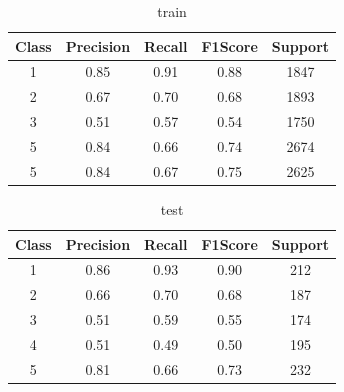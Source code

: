 \begin{enumerate}[label=(\alph*)]
\begin{enumerate}[label=\roman*.]
                    \begin{table}[!htb]
                        \centering
                        \begin{tabular}{ccccc}
                            \hline
                            Class & Precision & Recall & F1Score & Support \\ \hline
                            1     & 0.85      & 0.91   & 0.88    & 1847    \\
                            2     & 0.67      & 0.70   & 0.68    & 1893    \\
                            3     & 0.51      & 0.57   & 0.54    & 1750    \\
                            5     & 0.84      & 0.66   & 0.74    & 2674    \\
                            5     & 0.84      & 0.67   & 0.75    & 2625    \\ \hline
                        \end{tabular}
                        \caption{train}
                        \label{part d train depth 4}
                    \end{table}
                    \begin{table}[!htb]
                        \centering
                        \begin{tabular}{ccccc}
                            \hline
                            Class & Precision & Recall & F1Score & Support \\ \hline
                            1     & 0.86      & 0.93   & 0.90    & 212     \\
                            2     & 0.66      & 0.70   & 0.68    & 187     \\
                            3     & 0.51      & 0.59   & 0.55    & 174     \\
                            4     & 0.51      & 0.49   & 0.50    & 195     \\
                            5     & 0.81      & 0.66   & 0.73    & 232     \\ \hline
                        \end{tabular}
                        \caption{test}
                        \label{part d test depth 4}
                    \end{table}
                    \newpage



\end{enumerate}
\end{enumerate}
